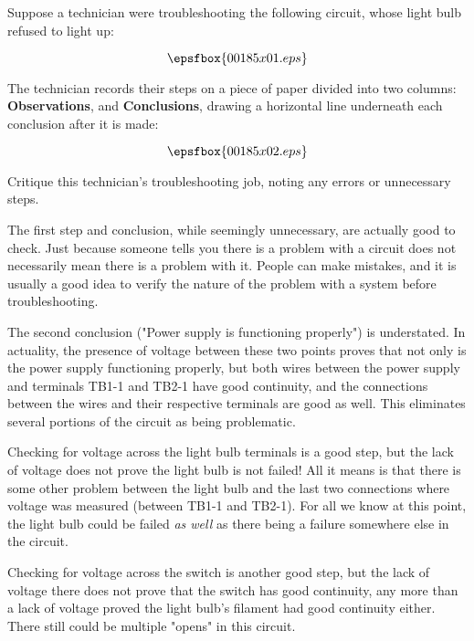 

Suppose a technician were troubleshooting the following circuit, whose light bulb refused to light up:

$$\epsfbox{00185x01.eps}$$

The technician records their steps on a piece of paper divided into two columns: {\bf Observations}, and {\bf Conclusions}, drawing a horizontal line underneath each conclusion after it is made:

$$\epsfbox{00185x02.eps}$$

Critique this technician's troubleshooting job, noting any errors or unnecessary steps.







The first step and conclusion, while seemingly unnecessary, are actually good to check.  Just because someone tells you there is a problem with a circuit does not necessarily mean there is a problem with it.  People can make mistakes, and it is usually a good idea to verify the nature of the problem with a system before troubleshooting.

The second conclusion ("Power supply is functioning properly") is understated.  In actuality, the presence of voltage between these two points proves that not only is the power supply functioning properly, but both wires between the power supply and terminals TB1-1 and TB2-1 have good continuity, and the connections between the wires and their respective terminals are good as well.  This eliminates several portions of the circuit as being problematic.

Checking for voltage across the light bulb terminals is a good step, but the lack of voltage does not prove the light bulb is not failed!  All it means is that there is some other problem between the light bulb and the last two connections where voltage was measured (between TB1-1 and TB2-1).  For all we know at this point, the light bulb could be failed {\it as well} as there being a failure somewhere else in the circuit.

Checking for voltage across the switch is another good step, but the lack of voltage there does not prove that the switch has good continuity, any more than a lack of voltage proved the light bulb's filament had good continuity either.  There still could be multiple "opens" in this circuit.

